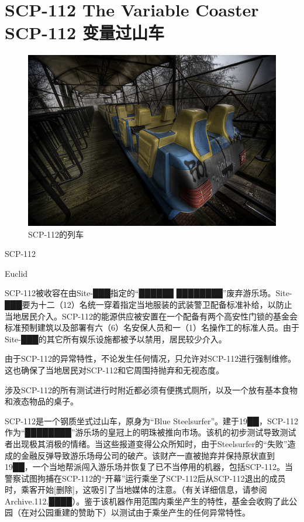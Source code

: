 \chapter[SCP-112 变量过山车]{
    SCP-112 The Variable Coaster\\
    SCP-112 变量过山车
}

\label{chap:SCP-112}

\begin{figure}[H]
    \centering
    \includegraphics[width=0.5\linewidth]{images/SCP.112.jpg}
    \caption*{SCP-112的列车}
\end{figure}

SCP-112

Euclid

SCP-112被收容在由Site-███指定的“██████ ████████”废弃游乐场。Site-███要为十二（12）名统一穿着指定当地服装的武装警卫配备标准补给，以防止当地居民介入。SCP-112的能源供应被安置在一个配备有两个高安性门锁的基金会标准预制建筑以及部署有六（6）名安保人员和一（1）名操作工的标准人员。由于Site-███的其它所有娱乐设施都被予以禁用，居民较少介入。

由于SCP-112的异常特性，不论发生任何情况，只允许对SCP-112进行强制维修。这也确保了当地居民对SCP-112和它周围持抛弃和无视态度。

涉及SCP-112的所有测试进行时附近都必须有便携式厕所，以及一个放有基本食物和液态物品的桌子。

SCP-112是一个钢质坐式过山车，原身为“Blue Steelsurfer”。建于19██，SCP-112作为“████████”游乐场的皇冠上的明珠被推向市场。该机的初步测试导致测试者出现极其消极的情绪。当这些报道变得公众所知时，由于Steelsurfer的“失败”造成的金融反弹导致游乐场母公司的破产。该财产一直被抛弃并保持原状直到19██，一个当地帮派闯入游乐场并恢复了已不当停用的机器，包括SCP-112。当警察试图拘捕在SCP-112的“开幕”运行乘坐了SCP-112后从SCP-112退出的成员时，乘客开始{[}删除]，这吸引了当地媒体的注意。（有关详细信息，请参阅Archive.112.████）。鉴于该机器作用范围内乘坐产生的特性，基金会收购了此公园（在对公园重建的赞助下）以测试由于乘坐产生的任何异常特性。

